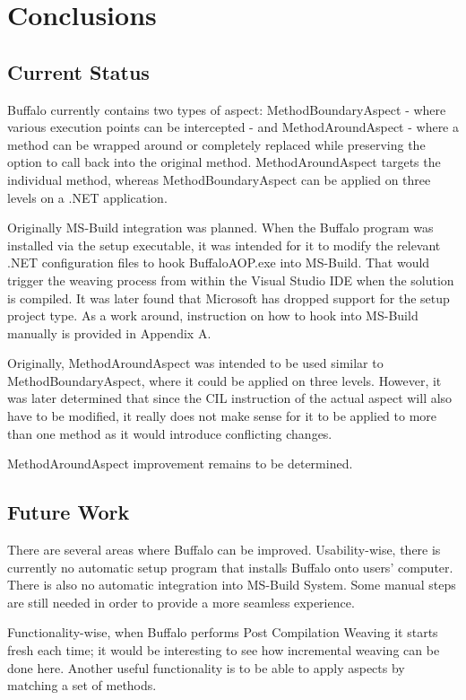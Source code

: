 \chapter{Conclusions}
\section{Current Status}

Buffalo currently contains two types of aspect:  MethodBoundaryAspect - where various execution points can be intercepted - and MethodAroundAspect - where a method can be wrapped around or completely replaced while preserving the option to call back into the original method. MethodAroundAspect targets the individual method, whereas MethodBoundaryAspect can be applied on three levels on a .NET application.

Originally MS-Build integration was planned. When the Buffalo program was installed via the setup executable, it was intended for it to modify the relevant .NET configuration files to hook BuffaloAOP.exe into MS-Build. That would trigger the weaving process from within the Visual Studio IDE when the solution is compiled. It was later found that Microsoft has dropped support for the setup project type. As a work around, instruction on how to hook into MS-Build manually is provided in Appendix A.

Originally, MethodAroundAspect was intended to be used similar to MethodBoundaryAspect, where it could be applied on three levels. However, it was later determined that since the CIL instruction of the actual aspect will also have to be modified, it really does not make sense for it to be applied to more than one method as it would introduce conflicting changes.

MethodAroundAspect improvement remains to be determined.

\section{Future Work}

There are several areas where Buffalo can be improved. Usability-wise, there is currently no automatic setup program that installs Buffalo onto users' computer. There is also no automatic integration into MS-Build System. Some manual steps are still needed in order to provide a more seamless experience.

Functionality-wise, when Buffalo performs Post Compilation Weaving it starts fresh each time; it would be interesting to see how incremental weaving can be done here. Another useful functionality is to be able to apply aspects by matching a set of methods.

